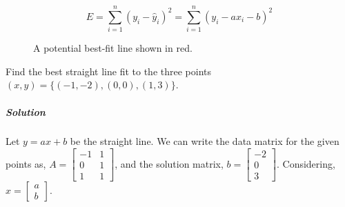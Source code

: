 \documentclass{article}
\newcounter{example}
\begin{document}
    \begin{equation}
        E=\sum_{i=1}^n{(y_i-\hat{y}_i)^2}=\sum_{i=1}^n{(y_i-ax_i-b)^2}
    \end{equation}

    \begin{figure}[ht]
        \centering
        \caption{A potential best-fit line shown in red.}
        \label{fig:2}
    \end{figure}
    
    \begin{example}
        Find the best straight line fit to the three points \((x,y)=\{(-1,-2),(0,0),(1,3)\}\).
    \end{example}

    \subparagraph{Solution}
    Let \(y=ax+b\) be the straight line. We can write the data matrix for the given points as, \(A=\begin{bmatrix}
            -1 & 1\\
            0 & 1\\
            1 & 1
        \end{bmatrix}\), and the solution matrix, \(b=\begin{bmatrix}
            -2\\
            0\\
            3
        \end{bmatrix}\). Considering, \(x=\begin{bmatrix}
            a\\
            b
        \end{bmatrix}\).
\end{document}
